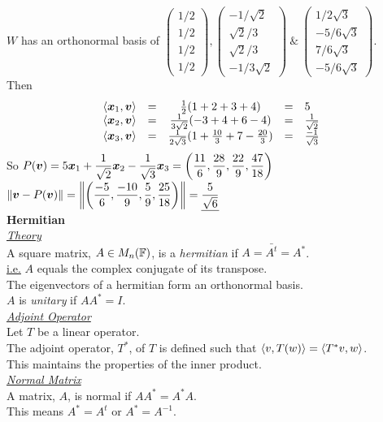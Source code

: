 \documentclass[11pt,a4paper]{article}
\begin{document}
$W$ has an orthonormal basis of $\begin{pmatrix} 1/2 \\ 1/2 \\ 1/2 \\ 1/2 \end{pmatrix}, \begin{pmatrix} -1/\sqrt{2} \\ \sqrt{2}/3 \\ \sqrt{2}/3 \\ -1/3\sqrt{2} \end{pmatrix}\ \&\ \begin{pmatrix} 1/2\sqrt{3} \\ -5/6\sqrt{3} \\ 7/6\sqrt{3} \\ -5/6\sqrt{3} \end{pmatrix}$.\\
Then\\
\[\begin{array}{rcccl}
  \langle \boldsymbol{x}_1, \boldsymbol{v} \rangle &=& \frac{1}{2}(1 + 2 + 3 + 4) &=& 5\\
  \langle \boldsymbol{x}_2, \boldsymbol{v} \rangle &=& \frac{1}{3\sqrt{2}}(-3+4+6-4) &=& \frac{1}{\sqrt{2}}\\
  \langle \boldsymbol{x}_3, \boldsymbol{v} \rangle &=& \frac{1}{2\sqrt{3}}(1 + \frac{10}{3} + 7 - \frac{20}{3}) &=& \frac{-1}{\sqrt{3}}
\end{array}\]
So $\displaystyle{P(\boldsymbol{v}) = 5\boldsymbol{x}_1 + \frac{1}{\sqrt{2}}\boldsymbol{x}_2 - \frac{1}{\sqrt{3}}\boldsymbol{x}_3 = \left(\frac{11}{6}, \frac{28}{9}, \frac{22}{9}, \frac{47}{18}\right)}$\\
$\displaystyle{\left\|\boldsymbol{v} - P(\boldsymbol{v})\right\| = \left\|\left(\frac{-5}{6}, \frac{-10}{9}, \frac{5}{9}, \frac{25}{18} \right)\right\| = \underline{\frac{5}{\sqrt{6}}}}$\\

\textbf{Hermitian}\\

\underline{\textit{Theory}}\\
A square matrix, $A \in M_n(\mathbb{F})$, is a \textit{hermitian} if $A = \bar{A^t} = A^*$.\\
\underline{i.e.} $A$ equals the complex conjugate of its transpose.\\
The eigenvectors of a hermitian form an orthonormal basis.\\
$A$ is \textit{unitary} if $AA^* = I$.\\

\underline{\textit{Adjoint Operator}}\\
Let $T$ be a linear operator.\\
The adjoint operator, $T^*$, of $T$ is defined such that $\langle v, T(w) \rangle = \langle T^*{v}, w \rangle$.\\
This maintains the properties of the inner product.\\

\underline{\textit{Normal Matrix}}\\
A matrix, $A$, is normal if $AA^* = A^*A$.\\
This means $A^* = A^t$ or $A^* = A^{-1}$.
\end{document}
